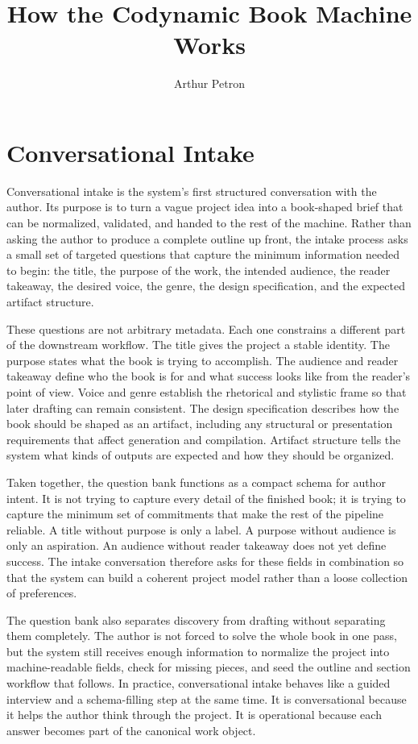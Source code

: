 \documentclass[11pt]{article}
\title{How the Codynamic Book Machine Works}
\author{Arthur Petron}
\begin{document}
\section*{Conversational Intake}

Conversational intake is the system's first structured conversation with the author. Its purpose is to turn a vague project idea into a book-shaped brief that can be normalized, validated, and handed to the rest of the machine. Rather than asking the author to produce a complete outline up front, the intake process asks a small set of targeted questions that capture the minimum information needed to begin: the title, the purpose of the work, the intended audience, the reader takeaway, the desired voice, the genre, the design specification, and the expected artifact structure.

These questions are not arbitrary metadata. Each one constrains a different part of the downstream workflow. The title gives the project a stable identity. The purpose states what the book is trying to accomplish. The audience and reader takeaway define who the book is for and what success looks like from the reader's point of view. Voice and genre establish the rhetorical and stylistic frame so that later drafting can remain consistent. The design specification describes how the book should be shaped as an artifact, including any structural or presentation requirements that affect generation and compilation. Artifact structure tells the system what kinds of outputs are expected and how they should be organized.

Taken together, the question bank functions as a compact schema for author intent. It is not trying to capture every detail of the finished book; it is trying to capture the minimum set of commitments that make the rest of the pipeline reliable. A title without purpose is only a label. A purpose without audience is only an aspiration. An audience without reader takeaway does not yet define success. The intake conversation therefore asks for these fields in combination so that the system can build a coherent project model rather than a loose collection of preferences.

The question bank also separates discovery from drafting without separating them completely. The author is not forced to solve the whole book in one pass, but the system still receives enough information to normalize the project into machine-readable fields, check for missing pieces, and seed the outline and section workflow that follows. In practice, conversational intake behaves like a guided interview and a schema-filling step at the same time. It is conversational because it helps the author think through the project. It is operational because each answer becomes part of the canonical work object.
\end{document}
